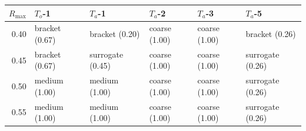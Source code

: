 \begin{tabular}{@{}rlllll@{}}
\toprule
$R_{\max}$ & $T_o$-1 & $T_a$-1 & $T_a$-2 & $T_a$-3 & $T_a$-5 \\
\midrule
0.40 & bracket (0.67) & bracket (0.20) & coarse (1.00) & coarse (1.00) & bracket (0.26) \\
0.45 & bracket (0.67) & surrogate (0.45) & coarse (1.00) & coarse (1.00) & surrogate (0.26) \\
0.50 & medium (1.00) & medium (1.00) & coarse (1.00) & coarse (1.00) & surrogate (0.26) \\
0.55 & medium (1.00) & medium (1.00) & coarse (1.00) & coarse (1.00) & surrogate (0.26) \\
\bottomrule
\end{tabular}
